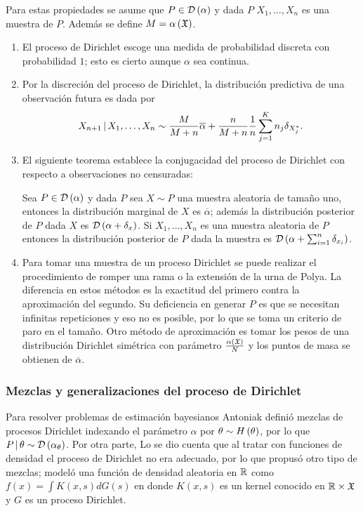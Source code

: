 \documentclass[runningheads,a4paper]{article}
\begin{document}
Para estas propiedades se asume que $P \in \mathcal{D}\left( \alpha \right)$ y dada $P$ $X_{1}, \ldots, X_{n}$ es una muestra de $P$. Además %
se define $M = \alpha\left( \mathfrak{X} \right)$.
\begin{enumerate}
    \item El proceso de Dirichlet escoge una medida de probabilidad discreta con probabilidad $1$; esto es cierto aunque %
    $\alpha$ sea continua.
    \item Por la discreción del proceso de Dirichlet, la distribución predictiva de una observación futura es dada por %
    \begin{equation} \label{eq:actualpd}
    X_{n+1} \,|\, X_{1}, \ldots, X_{n} \sim \frac{M}{M + n}\overline{\alpha} + \frac{n}{M + n} \frac{1}{n} \sum_{j = 1}^{%
    K} n_{j} \delta_{X_{j}^{*}}.
    \end{equation}
    \item El siguiente teorema establece la conjugacidad del proceso de Dirichlet con respecto a observaciones no %
    censuradas:
    \begin{teor}[Ferguson]
    Sea $P \in \mathcal{D}\left( \alpha \right)$ y dada $P$ sea $X \sim P$ una muestra aleatoria de tamaño uno, entonces la distribución %
    marginal de $X$ es $\overline{\alpha}$; además la distribución posterior de $P$ dada $X$ es $\D\Pp{\alpha + %
    \delta_{x}}$. Si $X_{1}, \ldots, X_{n}$ es una muestra aleatoria de $P$ entonces la distribución posterior de $P$ %
    dada la muestra es $\mathcal{D}\left( \alpha + \sum_{i = 1}^{n} \delta_{x_{i}} \right)$.
    \end{teor}
    \item Para tomar una muestra de un proceso Dirichlet se puede realizar el procedimiento de romper una rama o la %
    extensión de la urna de Polya. La diferencia en estos métodos es la exactitud del primero contra la aproximación %
    del segundo. Su deficiencia en generar $P$ es que se necesitan infinitas repeticiones y eso no es posible, por lo %
    que se toma un criterio de paro en el tamaño. Otro método de aproximación es tomar los pesos de una distribución %
    Dirichlet simétrica con parámetro $\frac{\alpha\left( \mathfrak{X} \right)}{N}$ y los puntos de masa se obtienen de $\overline{\alpha}$.
\end{enumerate}

\subsubsection{Mezclas y generalizaciones del proceso de Dirichlet}

Para resolver problemas de estimación bayesianos Antoniak definió mezclas de procesos Dirichlet indexando el parámetro %
$\alpha$ por $\theta \sim H\left( \theta \right)$, por lo que $P \,|\, \theta \sim \mathcal{D}\left( \alpha_{\theta} \right)$. Por otra parte, Lo se %
dio cuenta que al tratar con funciones de densidad el proceso de Dirichlet no era adecuado, por lo que propusó otro tipo %
de mezclas; modeló una función de densidad aleatoria en $\mathbb{R}$ como $f(x) = \int K(x, s) dG(s)$ en donde $K(x,s)$ es un %
kernel conocido en $\mathbb{R} \times \mathfrak{X}$ y $G$ es un proceso Dirichlet. 
\end{document}
